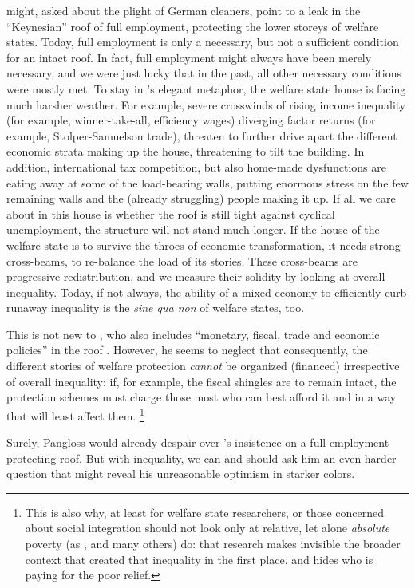 \begin{enumerate}
	\citeauthor{Offe2003} might, asked about the plight of German cleaners, point to a leak in the ``Keynesian'' roof of full employment, protecting the lower storeys of welfare states.
Today, full employment is only a necessary, but not a sufficient condition for an intact roof.
In fact, full employment might always have been merely necessary, and we were just lucky that in the past, all other necessary conditions were mostly met.
To stay in \citeauthor{Offe2003}'s elegant metaphor, the welfare state house is facing much harsher weather.
For example, severe crosswinds of rising income inequality (for example, winner-take-all, efficiency wages) diverging factor returns (for example, Stolper-Samuelson trade), threaten to further drive apart the different economic strata making up the house, threatening to tilt the building.
In addition, international tax competition, but also home-made dysfunctions are eating away at some of the load-bearing walls, putting enormous stress on the few remaining walls and the (already struggling) people making it up.
If all we care about in this house is whether the roof is still tight against cyclical unemployment, the structure will not stand much longer.
If the house of the welfare state is to survive the throes of economic transformation, it needs strong cross-beams, to re-balance the load of its stories.
These cross-beams are progressive redistribution, and we measure their solidity by looking at overall inequality.
Today, if not always, the ability of a mixed economy to efficiently curb runaway inequality is the \emph{sine qua non} of welfare states, too.

	This is not new to \cite{Offe2003}, who also includes ``monetary, fiscal, trade and economic policies'' in the roof \citeyearpar[543]{Offe2003}.
However, he seems to neglect that consequently, the different stories of welfare protection \emph{cannot} be organized (financed) irrespective of overall inequality:
if, for example, the fiscal shingles are to remain intact, the protection schemes must charge those most who can best afford it and in a way that will least affect them.
\footnote{
		This is also why, at least for welfare state researchers, or those concerned about social integration should not look only at relative, let alone \emph{absolute} poverty (as \citet[1]{Grow2005}, and many others) do:
that research makes invisible the broader context that created that inequality in the first place, and hides who is paying for the poor relief.
}

	Surely, Pangloss would already despair over \cite{Offe2003}'s insistence on a full-employment protecting roof.
But with inequality, we can and should ask him an even harder question that might reveal his unreasonable optimism in starker colors.


\end{enumerate}
